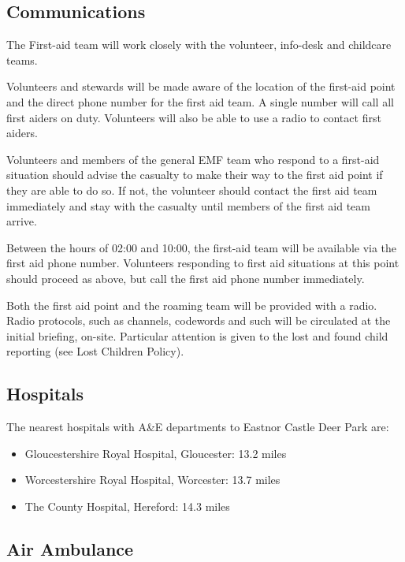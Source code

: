 \subsection{Communications}

The First-aid team will work closely with the volunteer, info-desk and childcare
teams.

Volunteers and stewards will be made aware of the location of the first-aid
point and the direct phone number for the first aid team. A single number will 
call all first aiders on duty. Volunteers will also be able to use a radio to 
contact first aiders.

Volunteers and members of the general EMF team who respond to a first-aid
situation should advise the casualty to make their way to the first aid point
if they are able to do so. If not, the volunteer should contact the first aid
team immediately and stay with the casualty until members of the first aid team
arrive.

Between the hours of 02:00 and 10:00, the first-aid team will be available via the
first aid phone number. Volunteers responding to first aid situations at this
point should proceed as above, but call the first aid phone number
immediately.

Both the first aid point and the roaming team will be provided with a radio.
Radio protocols, such as channels, codewords and such will be circulated at the
initial briefing, on-site. Particular attention is given to the lost and found
child reporting (see Lost Children Policy).

\subsection{Hospitals}

The nearest hospitals with A\&E departments to Eastnor Castle Deer Park are:

\begin{itemize}
    \tightlist
\item Gloucestershire Royal Hospital, Gloucester: 13.2 miles
\item Worcestershire Royal Hospital, Worcester: 13.7 miles
\item The County Hospital, Hereford: 14.3 miles
\end{itemize}

\subsection{Air Ambulance}

